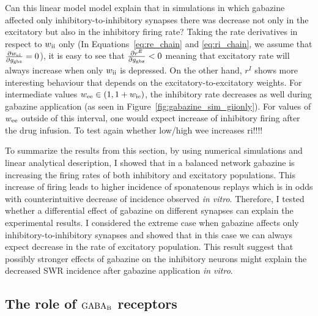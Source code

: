     Can this linear model model explain that in simulations in which gabazine
    affected only inhibitory-to-inhibitory synapses there was decrease not only
    in the excitatory but also in the inhibitory firing rate? Taking the rate
    derivatives in respect to $w_{\rm ii}$ only (In Equations~\ref{eq:re_chain}
    and \ref{eq:ri_chain}, we assume that $\frac{\partial w_{\rm ei}}{\partial
    g_{\rm gbz}} = 0$), it is easy to see that $\frac{\partial r^E}{\partial
    g_{\rm gbz}} < 0 $ meaning that excitatory rate will always increase when
    only $w_{\rm ii}$ is depressed. On the other hand, $r^I$ shows more
    interesting behaviour that depends on the excitatory-to-excitatory weights.
    For intermediate values $w_{\rm ee} \in (1, 1+w_{\rm ie})$, the inhibitory
    rate decreases as well during gabazine application (as seen in
    Figure~\ref{fig:gabazine_sim_giionly}). For values of $w_{\rm ee}$ outside
    of this interval, one would expect increase of inhibitory firing after the
    drug infusion. To test again whether low/high wee increases ri!!!!

    To summarize the results from this section, by using numerical simulations
    and linear analytical description, I showed that in a balanced network
    gabazine is increasing the firing rates of both inhibitory and excitatory
    populations. This increase of firing leads to higher incidence of
    sponatenous replays which is in odds with counterintuitive decrease of
    incidence observed {\textit {in vitro}}. Therefore, I tested whether a
    differential effect of gabazine on different synapses can explain the
    experimental results. I considered the extreme case when gabazine affects
    only inhibitory-to-inhibitory synapses and showed that in this case we can
    always expect decrease in the rate of excitatory population. This result
    suggest that possibly stronger effects of gabazine on the inhibitory
    neurons might explain the decreased SWR incidence after gabazine
    application {\textit {in vitro}}.
    
  \subsection{The role of $\rm GABA_B$ receptors}

